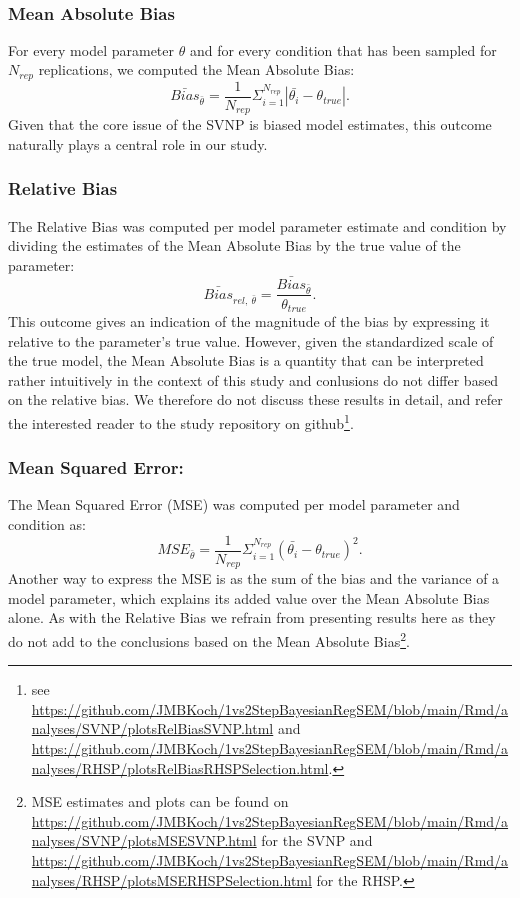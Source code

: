 \documentclass[]{interact}
\theoremstyle{plain}%
\theoremstyle{definition}
\theoremstyle{remark}
\begin{document}
~

\hypertarget{mean-absolute-bias}{%
\subsubsection{Mean Absolute Bias}\label{mean-absolute-bias}}

For every model parameter \(\theta\) and for every condition that has
been sampled for \(N_{rep}\) replications, we computed the Mean Absolute
Bias:
\[\bar{Bias}_{\bar{\theta}} = \frac{1}{N_{rep}} \Sigma_{i = 1}^{N_{rep}} |\bar{\theta_i} - \theta_{true}|.\]
Given that the core issue of the SVNP is biased model estimates, this
outcome naturally plays a central role in our study.

\hypertarget{relative-bias}{%
\subsubsection{Relative Bias}\label{relative-bias}}

The Relative Bias was computed per model parameter estimate and
condition by dividing the estimates of the Mean Absolute Bias by the
true value of the parameter:
\[\bar{Bias}_{rel, \ \bar{\theta} } = \frac{\bar{Bias}_{\bar{\theta}}}{\theta_{true} }.\]
This outcome gives an indication of the magnitude of the bias by
expressing it relative to the parameter's true value. However, given the
standardized scale of the true model, the Mean Absolute Bias is a
quantity that can be interpreted rather intuitively in the context of
this study and conlusions do not differ based on the relative bias. We
therefore do not discuss these results in detail, and refer the
interested reader to the study repository on github\footnote{see
  \url{https://github.com/JMBKoch/1vs2StepBayesianRegSEM/blob/main/Rmd/analyses/SVNP/plotsRelBiasSVNP.html}
  and
  \url{https://github.com/JMBKoch/1vs2StepBayesianRegSEM/blob/main/Rmd/analyses/RHSP/plotsRelBiasRHSPSelection.html}.}.

\hypertarget{mean-squared-error}{%
\subsubsection{Mean Squared Error:}\label{mean-squared-error}}

The Mean Squared Error (MSE) was computed per model parameter and
condition as:
\[MSE_{\bar{\theta}} = \frac{1}{N_{rep}} \Sigma_{i = 1}^{N_{rep}} (\bar{\theta_i} - \theta_{true})^2.\]
Another way to express the MSE is as the sum of the bias and the
variance of a model parameter, which explains its added value over the
Mean Absolute Bias alone. As with the Relative Bias we refrain from
presenting results here as they do not add to the conclusions based on
the Mean Absolute Bias\footnote{MSE estimates and plots can be found on
  \url{https://github.com/JMBKoch/1vs2StepBayesianRegSEM/blob/main/Rmd/analyses/SVNP/plotsMSESVNP.html}
  for the SVNP and
  \url{https://github.com/JMBKoch/1vs2StepBayesianRegSEM/blob/main/Rmd/analyses/RHSP/plotsMSERHSPSelection.html}
  for the RHSP.}.
\end{document}
